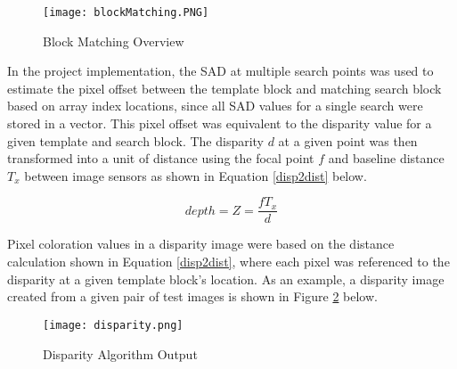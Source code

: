 \par
\begin{figure}[h]
	\centerline{\texttt{[image: blockMatching.PNG]}}
	\caption{Block Matching Overview \cite{collins}}
	\label{blockMatching}
\end{figure}
\par
In the project implementation, the SAD at multiple search points was used to estimate the pixel offset between the template block and matching search block based on array index locations, since all SAD values for a single search were stored in a vector. This pixel offset was equivalent to the disparity value for a given template and search block. The disparity $d$ at a given point was then transformed into a unit of distance using the focal point $f$ and baseline distance $T_x$ between image sensors as shown in Equation \ref{disp2dist} below. 
\par
\begin{equation}\label{disp2dist}
depth = Z = \frac{fT_x}{d}
\end{equation}
\par
Pixel coloration values in a disparity image were based on the distance calculation shown in Equation \ref{disp2dist}, where each pixel was referenced to the disparity at a given template block's location. As an example, a disparity image created from a given pair of test images is shown in Figure \ref{disparityOutput} below. 
\par
\begin{figure}[H]
	\centerline{\texttt{[image: disparity.png]}}
	\caption{Disparity Algorithm Output}
	\label{disparityOutput}
\end{figure}